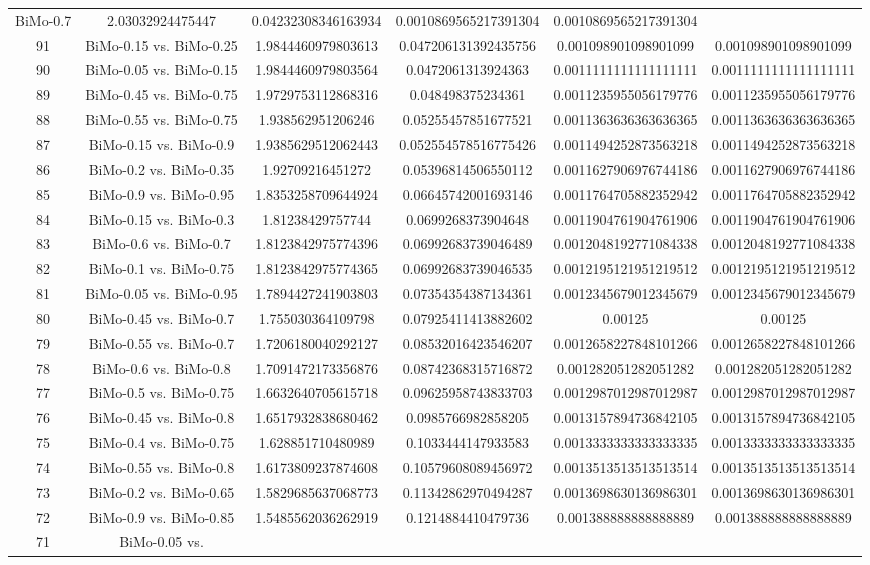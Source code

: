 \documentclass[a4paper,10pt]{article}
\begin{document}
\begin{landscape}
\begin{table}[!htp]
\begin{tabular}{cccccc}
BiMo-0.7&2.03032924475447&0.04232308346163934&0.0010869565217391304&0.0010869565217391304\\91&BiMo-0.15 vs. BiMo-0.25&1.9844460979803613&0.047206131392435756&0.001098901098901099&0.001098901098901099\\90&BiMo-0.05 vs. BiMo-0.15&1.9844460979803564&0.0472061313924363&0.0011111111111111111&0.0011111111111111111\\89&BiMo-0.45 vs. BiMo-0.75&1.9729753112868316&0.048498375234361&0.0011235955056179776&0.0011235955056179776\\88&BiMo-0.55 vs. BiMo-0.75&1.938562951206246&0.05255457851677521&0.0011363636363636365&0.0011363636363636365\\87&BiMo-0.15 vs. BiMo-0.9&1.9385629512062443&0.052554578516775426&0.0011494252873563218&0.0011494252873563218\\86&BiMo-0.2 vs. BiMo-0.35&1.92709216451272&0.05396814506550112&0.0011627906976744186&0.0011627906976744186\\85&BiMo-0.9 vs. BiMo-0.95&1.8353258709644924&0.06645742001693146&0.0011764705882352942&0.0011764705882352942\\84&BiMo-0.15 vs. BiMo-0.3&1.81238429757744&0.0699268373904648&0.0011904761904761906&0.0011904761904761906\\83&BiMo-0.6 vs. BiMo-0.7&1.8123842975774396&0.06992683739046489&0.0012048192771084338&0.0012048192771084338\\82&BiMo-0.1 vs. BiMo-0.75&1.8123842975774365&0.06992683739046535&0.0012195121951219512&0.0012195121951219512\\81&BiMo-0.05 vs. BiMo-0.95&1.7894427241903803&0.07354354387134361&0.0012345679012345679&0.0012345679012345679\\80&BiMo-0.45 vs. BiMo-0.7&1.755030364109798&0.07925411413882602&0.00125&0.00125\\79&BiMo-0.55 vs. BiMo-0.7&1.7206180040292127&0.08532016423546207&0.0012658227848101266&0.0012658227848101266\\78&BiMo-0.6 vs. BiMo-0.8&1.7091472173356876&0.08742368315716872&0.001282051282051282&0.001282051282051282\\77&BiMo-0.5 vs. BiMo-0.75&1.6632640705615718&0.09625958743833703&0.0012987012987012987&0.0012987012987012987\\76&BiMo-0.45 vs. BiMo-0.8&1.6517932838680462&0.0985766982858205&0.0013157894736842105&0.0013157894736842105\\75&BiMo-0.4 vs. BiMo-0.75&1.628851710480989&0.1033444147933583&0.0013333333333333335&0.0013333333333333335\\74&BiMo-0.55 vs. BiMo-0.8&1.6173809237874608&0.10579608089456972&0.0013513513513513514&0.0013513513513513514\\73&BiMo-0.2 vs. BiMo-0.65&1.5829685637068773&0.11342862970494287&0.0013698630136986301&0.0013698630136986301\\72&BiMo-0.9 vs. BiMo-0.85&1.5485562036262919&0.1214884410479736&0.001388888888888889&0.001388888888888889\\71&BiMo-0.05 vs. 
\end{tabular}
\end{table}
\end{landscape}
\end{document}
